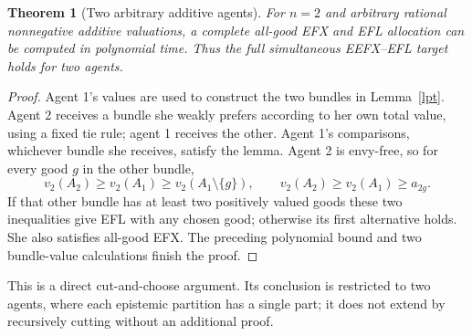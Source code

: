 \documentclass[11pt]{article}
\newtheorem{theorem}{Theorem}
\theoremstyle{definition}
\begin{document}
\begin{theorem}[Two arbitrary additive agents]\label{two}
For $n=2$ and arbitrary rational nonnegative additive valuations, a
complete all-good EFX and EFL allocation can be computed in polynomial
time. Thus the full simultaneous EEFX--EFL target holds for two agents.
\end{theorem}
\begin{proof}
Agent 1's values are used to construct the two bundles in
Lemma~\ref{lpt}. Agent 2 receives a bundle she weakly prefers according
to her own total value, using a fixed tie rule; agent 1 receives the other.
Agent 1's comparisons, whichever bundle she receives, satisfy the lemma.
Agent 2 is envy-free, so for every good $g$ in the other bundle,
\[
 v_2(A_2)\ge v_2(A_1)\ge v_2(A_1\setminus\{g\}),\qquad
 v_2(A_2)\ge v_2(A_1)\ge a_{2g}.
\]
If that other bundle has at least two positively valued goods these two
inequalities give EFL with any chosen good; otherwise its first
alternative holds. She also satisfies all-good EFX. The preceding
polynomial bound and two bundle-value calculations finish the proof.
\end{proof}
This is a direct cut-and-choose argument. Its conclusion is restricted to
two agents, where each epistemic partition has a single part; it does not
extend by recursively cutting without an additional proof.
\end{document}
